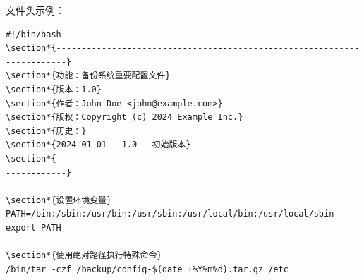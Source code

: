 \documentclass[12pt,UTF8]{ctexbook}
\begin{document}
文件头示例：
\begin{verbatim}
#!/bin/bash
\section*{------------------------------------------------------------------------}
\section*{功能：备份系统重要配置文件}
\section*{版本：1.0}
\section*{作者：John Doe <john@example.com>}
\section*{版权：Copyright (c) 2024 Example Inc.}
\section*{历史：}
\section*{2024-01-01 - 1.0 - 初始版本}
\section*{------------------------------------------------------------------------}

\section*{设置环境变量}
PATH=/bin:/sbin:/usr/bin:/usr/sbin:/usr/local/bin:/usr/local/sbin
export PATH

\section*{使用绝对路径执行特殊命令}
/bin/tar -czf /backup/config-$(date +%Y%m%d).tar.gz /etc
\end{verbatim}
\end{document}
